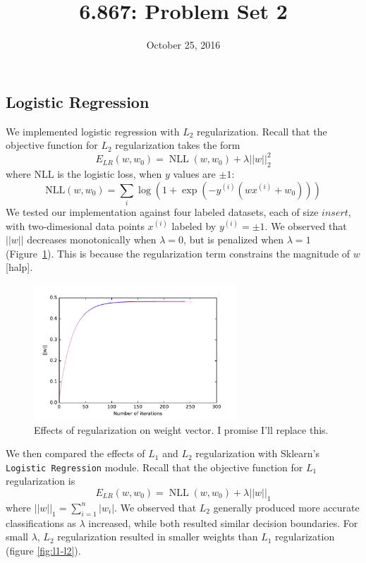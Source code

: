 \documentclass{article}
\title{6.867: Problem Set 2}
\date{October 25, 2016}
\DeclareMathOperator{\NLL}{NLL}
\newcommand{\sind}[1]{^{(#1)}}
\begin{document}
\maketitle

\begin{multicols}{2}


\section{Logistic Regression}

We implemented logistic regression with $L_2$ regularization.
Recall that the objective function for $L_2$ regularization takes the form
\begin{equation}
    E_{LR}(w, w_0) = \NLL(w, w_0) + \lambda ||w||_2^2
\end{equation}
where NLL is the logistic loss, when $y$ values are $\pm 1$:
\begin{equation}
    \text{NLL}(w, w_0) = \sum_i{\log(1+\exp(-y^{(i)}(wx^{(i)}+w_0)))}
\end{equation}
We tested our implementation against four labeled datasets,
each of size $insert$, %
with two-dimesional data points $x\sind{i}$ labeled by $y\sind{i} = \pm1$.
We observed that $||w||$ decreases monotonically when $\lambda=0$,  %
but is penalized when $\lambda=1$ (Figure~\ref{fig:weight-regularization}).
This is because the regularization term constrains the magnitude of $w$ [halp].

\begin{figure}
   \centering
   \includegraphics[width=3in]{figures/1-1-weights.pdf}
   \caption{Effects of regularization on weight vector. I promise I'll replace this.}
   \label{fig:weight-regularization}
\end{figure}

We then compared the effects of $L_1$ and $L_2$ regularization
with Sklearn's \texttt{Logistic Regression} module.  %
Recall that the objective function for $L_1$ regularization is
\begin{equation}
    E_{LR}(w, w_0) = \NLL(w, w_0) + \lambda ||w||_1
\end{equation}
where $||w||_1 = \sum_{i=1}^n{|w_i|}$.
We observed that $L_2$ generally produced
more accurate classifications as $\lambda$ increased,
while both resulted similar decision boundaries.
For small $\lambda$,
$L_2$ regularization resulted in smaller weights
than $L_1$ regularization (figure \ref{fig:l1-l2}).


\end{multicols}
\end{document}
